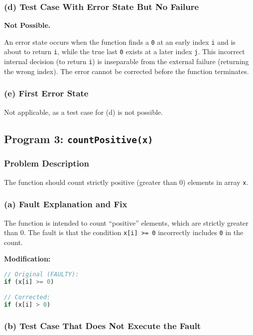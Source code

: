 \documentclass[11pt,a4paper]{article}
\begin{document}
\subsubsection{(d) Test Case With Error State But No Failure}

\textbf{Not Possible.}

 An error state occurs when the function finds a \texttt{0} at an early index \texttt{i} and is about to return \texttt{i}, while the true last \texttt{0} exists at a later index \texttt{j}. This incorrect internal decision (to return \texttt{i}) is inseparable from the external failure (returning the wrong index). The error cannot be corrected before the function terminates.

\subsubsection{(e) First Error State}

Not applicable, as a test case for (d) is not possible.

\subsection{Program 3: \texttt{countPositive(x)}}

\subsubsection{Problem Description}
The function should count strictly positive (greater than 0) elements in array \texttt{x}.

\subsubsection{(a) Fault Explanation and Fix}

 The function is intended to count ``positive'' elements, which are strictly greater than 0. The fault is that the condition \texttt{x[i] >= 0} incorrectly includes \texttt{0} in the count.

\textbf{Modification:}
\begin{lstlisting}[language=JavaScript]
// Original (FAULTY):
if (x[i] >= 0)

// Corrected:
if (x[i] > 0)
\end{lstlisting}

\subsubsection{(b) Test Case That Does Not Execute the Fault}
\end{document}
